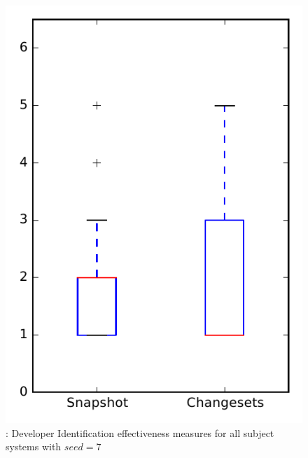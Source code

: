 
\begin{figure}
\centering
\includegraphics[height=0.4\textheight]{figures/dit_seed/rq1_overview_7}
\caption{\rtwo: Developer Identification effectiveness measures for all subject systems with $seed=7$}
\label{fig:dit_seed:rq1:overview}
\end{figure}
